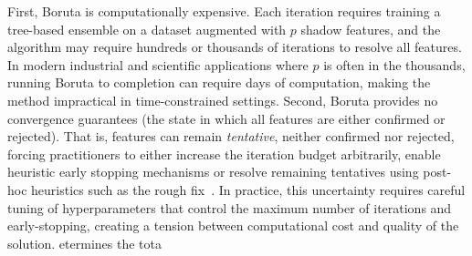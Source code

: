 \documentclass[runningheads]{llncs}
\begin{document}
First, Boruta is computationally expensive. Each iteration requires training a tree-based ensemble on a dataset augmented with $p$ shadow features, and the algorithm may require hundreds or thousands of iterations to resolve all features. In modern industrial and scientific applications where $p$ is often in the thousands, running Boruta to completion can require days of computation, making the method impractical in time-constrained settings. Second, Boruta provides no convergence guarantees (the state in which all features are either confirmed or rejected). That is, features can remain \emph{tentative}, neither confirmed nor rejected, forcing practitioners to either increase the iteration budget arbitrarily, enable heuristic early stopping mechanisms or resolve remaining tentatives using post-hoc heuristics such as the rough fix~\cite{kursa2010feature}. In practice, this uncertainty requires careful tuning of hyperparameters that control the maximum number of iterations and early-stopping, creating a tension between computational cost and quality of the solution.
etermines the tota
\end{document}
